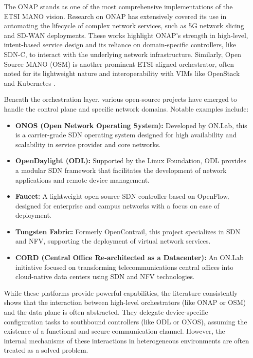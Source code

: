 \documentclass[12pt, a4paper, reqno, oneside]{book}
\begin{document}
The ONAP stands as one of the most comprehensive implementations of the ETSI MANO vision. Research on ONAP has extensively covered its use in automating the lifecycle of complex network services, such as 5G network slicing and SD-WAN deployments. These works highlight ONAP's strength in high-level, intent-based service design and its reliance on domain-specific controllers, like SDN-C, to interact with the underlying network infrastructure. Similarly, Open Source MANO (OSM) is another prominent ETSI-aligned orchestrator, often noted for its lightweight nature and interoperability with VIMs like OpenStack and Kubernetes \cite{Mamushiane2019}.

Beneath the orchestration layer, various open-source projects have emerged to handle the control plane and specific network domains. Notable examples include:
\begin{itemize}
\item \textbf{ONOS (Open Network Operating System):} Developed by ON.Lab, this is a carrier-grade SDN operating system designed for high availability and scalability in service provider and core networks.
\item \textbf{OpenDaylight (ODL):} Supported by the Linux Foundation, ODL provides a modular SDN framework that facilitates the development of network applications and remote device management.
\item \textbf{Faucet:} A lightweight open-source SDN controller based on OpenFlow, designed for enterprise and campus networks with a focus on ease of deployment.
\item \textbf{Tungsten Fabric:} Formerly OpenContrail, this project specializes in SDN and NFV, supporting the deployment of virtual network services.
\item \textbf{CORD (Central Office Re-architected as a Datacenter):} An ON.Lab initiative focused on transforming telecommunications central offices into cloud-native data centers using SDN and NFV technologies.
\end{itemize}

While these platforms provide powerful capabilities, the literature consistently shows that the interaction between high-level orchestrators (like ONAP or OSM) and the data plane is often abstracted. They delegate device-specific configuration tasks to southbound controllers (like ODL or ONOS), assuming the existence of a functional and secure communication channel. However, the internal mechanisms of these interactions in heterogeneous environments are often treated as a solved problem.
\end{document}
